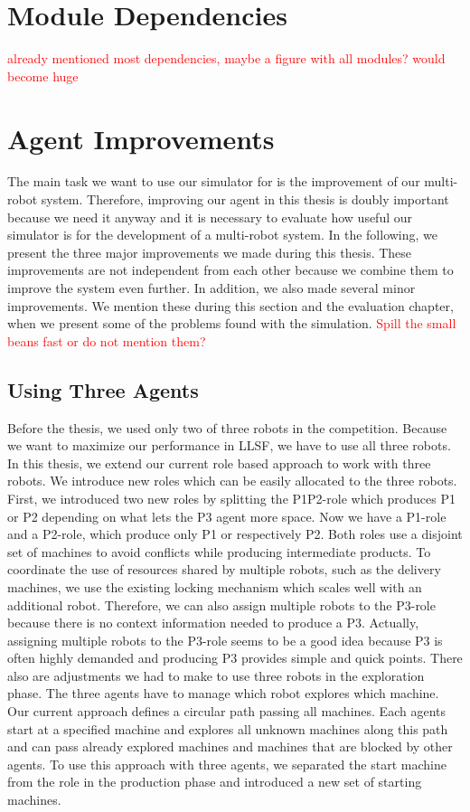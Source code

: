 \section{Module Dependencies}
\label{sec:module_dependencies}
\textcolor{red}{already mentioned most dependencies, maybe a figure with all modules? would become huge}


\section{Agent Improvements}
\label{sec:agent_improvements}
The main task we want to use our simulator for is the improvement of our multi-robot system. Therefore, improving our agent in this thesis is doubly important because we need it anyway and it is necessary to evaluate how useful our simulator is for the development of a multi-robot system. In the following, we present the three major improvements we made during this thesis. These improvements are not independent from each other because we combine them to improve the system even further. In addition, we also made several minor improvements. We mention these during this section and the evaluation chapter, when we present some of the problems found with the simulation. \textcolor{red}{Spill the small beans fast or do not mention them?}


\subsection{Using Three Agents}
Before the thesis, we used only two of three robots in the competition. Because we want to maximize our performance in LLSF, we have to use all three robots. In this thesis, we extend our current role based approach to work with three robots. We introduce new roles which can be easily allocated to the three robots.\\
First, we introduced two new roles by splitting the P1P2-role which produces P1 or P2 depending on what lets the P3 agent more space. Now we have a P1-role and a P2-role, which produce only P1 or respectively P2. Both roles use a disjoint set of machines to avoid conflicts while producing intermediate products. To coordinate the use of resources shared by multiple robots, such as the delivery machines, we use the existing locking mechanism which scales well with an additional robot. Therefore, we can also assign multiple robots to the P3-role because there is no context information needed to produce a P3. Actually, assigning multiple robots to the P3-role seems to be a good idea because P3 is often highly demanded and producing P3 provides simple and quick points. There also are adjustments we had to make to use three robots in the exploration phase. The three agents have to manage which robot explores which machine. Our current approach defines a circular path passing all machines. Each agents start at a specified machine and explores all unknown machines along this path and can pass already explored machines and machines that are blocked by other agents. To use this approach with three agents, we separated the start machine from the role in the production phase and introduced a new set of starting machines.

